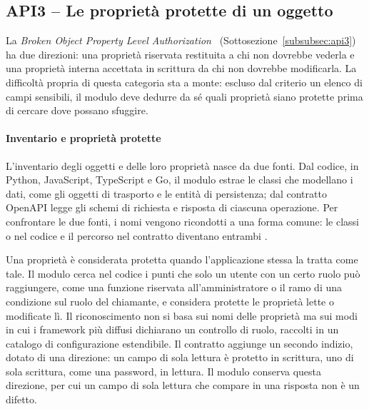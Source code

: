 \subsection{API3 -- Le proprietà protette di un oggetto}
\label{sec:rilevamento-bopla}

La \emph{Broken Object Property Level Authorization}~\cite{owasp2023api3}
(Sottosezione~\ref{subsubsec:api3}) ha due direzioni: una proprietà riservata
restituita a chi non dovrebbe vederla e una proprietà interna accettata in
scrittura da chi non dovrebbe modificarla. La difficoltà propria di questa
categoria sta a monte: escluso dal criterio un elenco di campi sensibili, il
modulo deve dedurre da sé quali proprietà siano protette prima di cercare dove
possano sfuggire.

\paragraph{Inventario e proprietà protette}
L'inventario degli oggetti e delle loro proprietà nasce da due fonti. Dal
codice, in Python, JavaScript, TypeScript e Go, il modulo estrae le classi che
modellano i dati, come gli oggetti di trasporto e le entità
di persistenza; dal contratto OpenAPI legge gli schemi di richiesta e risposta
di ciascuna operazione. Per confrontare le due fonti, i nomi vengono ricondotti
a una forma comune: le classi  o  nel codice e il
percorso  nel contratto diventano entrambi .

Una proprietà è considerata protetta quando l'applicazione stessa la tratta
come tale. Il modulo cerca nel codice i punti che solo un utente con un certo
ruolo può raggiungere, come una funzione riservata all'amministratore o il ramo
di una condizione sul ruolo del chiamante, e considera protette le proprietà
lette o modificate lì. Il riconoscimento non si basa sui nomi delle proprietà ma
sui modi in cui i framework più diffusi dichiarano un controllo di ruolo,
raccolti in un catalogo di configurazione estendibile. Il contratto aggiunge un secondo indizio, dotato di una
direzione: un campo di sola lettura è protetto in scrittura, uno di sola
scrittura, come una password, in lettura. Il modulo conserva questa direzione,
per cui un campo di sola lettura che compare in una risposta non è un difetto.

